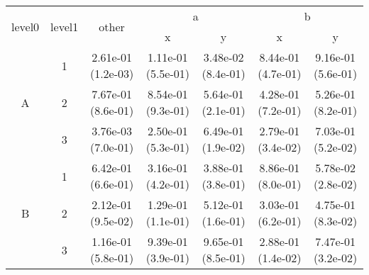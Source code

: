 \begin{tabular}{ccccccc}
\toprule
\multirow{2}{*}{level0} & \multirow{2}{*}{level1}& \multirow{2}{*}{other}&\multicolumn{2}{c}{a}&\multicolumn{2}{c}{b}\tabularnewline
\cmidrule(lr){4-5}
\cmidrule(lr){6-7}
&&&x&y&x&y\tabularnewline
\midrule
\multirow{3}{*}{A}&1& 2.61e-01 (1.2e-03)& 1.11e-01 (5.5e-01)& 3.48e-02 (8.4e-01)& 8.44e-01 (4.7e-01)& 9.16e-01 (5.6e-01)\tabularnewline
&2& 7.67e-01 (8.6e-01)& 8.54e-01 (9.3e-01)& 5.64e-01 (2.1e-01)& 4.28e-01 (7.2e-01)& 5.26e-01 (8.2e-01)\tabularnewline
&3& 3.76e-03 (7.0e-01)& 2.50e-01 (5.3e-01)& 6.49e-01 (1.9e-02)& 2.79e-01 (3.4e-02)& 7.03e-01 (5.2e-02)\tabularnewline
\midrule
\multirow{3}{*}{B}&1& 6.42e-01 (6.6e-01)& 3.16e-01 (4.2e-01)& 3.88e-01 (3.8e-01)& 8.86e-01 (8.0e-01)& 5.78e-02 (2.8e-02)\tabularnewline
&2& 2.12e-01 (9.5e-02)& 1.29e-01 (1.1e-01)& 5.12e-01 (1.6e-01)& 3.03e-01 (6.2e-01)& 4.75e-01 (8.3e-02)\tabularnewline
&3& 1.16e-01 (5.8e-01)& 9.39e-01 (3.9e-01)& 9.65e-01 (8.5e-01)& 2.88e-01 (1.4e-02)& 7.47e-01 (3.2e-02)\tabularnewline
\bottomrule
\end{tabular}
